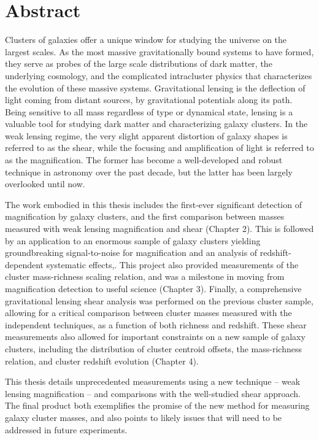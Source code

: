 
\chapter{Abstract}

Clusters of galaxies offer a unique window for studying the universe on the largest scales. As the most massive gravitationally bound systems to have formed, they serve as probes of the large scale distributions of dark matter, the underlying cosmology, and the complicated intracluster physics that characterizes the evolution of these massive systems. Gravitational lensing is the deflection of light coming from distant sources, by gravitational potentials along its path. Being sensitive to all mass regardless of type or dynamical state, lensing is a valuable tool for studying dark matter and characterizing galaxy clusters. In the weak lensing regime, the very slight apparent distortion of galaxy shapes is referred to as the shear, while the focusing and amplification of light is referred to as the magnification. The former has become a well-developed and robust technique in astronomy over the past decade, but the latter has been largely overlooked until now.

The work embodied in this thesis includes the first-ever significant detection of magnification by galaxy clusters, and the first comparison between masses measured with weak lensing magnification and shear (Chapter 2). This is followed by an application to an enormous sample of galaxy clusters yielding groundbreaking signal-to-noise for magnification and an analysis of redshift-dependent systematic effects,. This project also provided measurements of the cluster mass-richness scaling relation, and was a milestone in moving from magnification detection to useful science (Chapter 3). Finally, a comprehensive gravitational lensing shear analysis was performed on the previous cluster sample, allowing for a critical comparison between cluster masses measured with the independent techniques, as a function of both richness and redshift. These shear measurements also allowed for important constraints on a new sample of galaxy clusters, including the distribution of cluster centroid offsets, the mass-richness relation, and cluster redshift evolution (Chapter 4). 

This thesis details unprecedented measurements using a new technique -- weak lensing magnification -- and comparisons with the well-studied shear approach. The final product both exemplifies the promise of the new method for measuring galaxy cluster masses, and also points to likely issues that will need to be addressed in future experiments.



